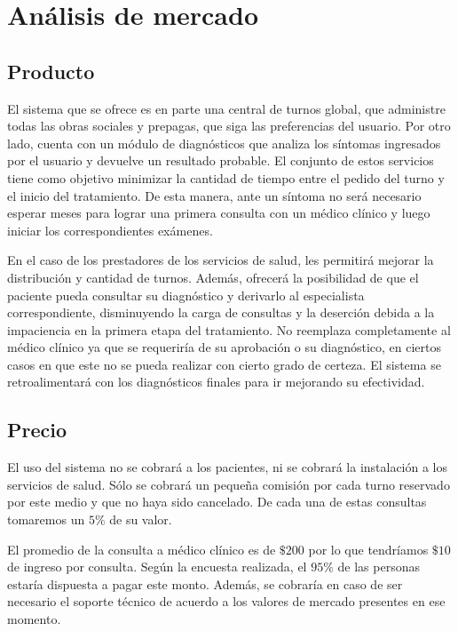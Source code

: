 \documentclass[a4paper,10pt]{article}
\begin{document}
\section{Análisis de mercado}

\subsection{Producto}

El sistema que se ofrece es en parte una central de turnos global, que administre todas las obras sociales y prepagas, que siga las preferencias del usuario. Por otro lado, cuenta con un módulo de diagnósticos que analiza los síntomas ingresados por el usuario y devuelve un resultado probable. El conjunto de estos servicios tiene como objetivo minimizar la cantidad de tiempo entre el pedido del turno y el inicio del tratamiento. De esta manera, ante un síntoma no será necesario esperar meses para lograr una primera consulta con un médico clínico y luego iniciar los correspondientes exámenes.

En el caso de los prestadores de los servicios de salud, les permitirá  mejorar la distribución y cantidad de turnos. Además, ofrecerá la posibilidad de que el paciente pueda consultar su diagnóstico y derivarlo al especialista correspondiente, disminuyendo la carga de consultas y la deserción debida a la impaciencia en la primera etapa del tratamiento. No reemplaza completamente al médico clínico ya que se requeriría de su aprobación o su diagnóstico, en ciertos casos en que este no se pueda realizar con cierto grado de certeza. El sistema se retroalimentará con los diagnósticos finales para ir mejorando su efectividad.


\subsection{Precio}

El uso del sistema no se cobrará a los pacientes, ni se cobrará la instalación a los servicios de salud. Sólo se cobrará un pequeña comisión por cada turno reservado por este medio y que no haya sido
cancelado. De cada una de estas consultas tomaremos un $5\%$ de su valor. 

El promedio de la consulta a médico clínico es de $\$200$ por lo que tendríamos $\$10$ de ingreso por consulta. Según la encuesta realizada, el $95\%$ de las personas estaría dispuesta a pagar este monto. Además, se cobraría en caso de ser necesario el soporte técnico de acuerdo a los valores de mercado presentes en ese momento. 
\end{document}
